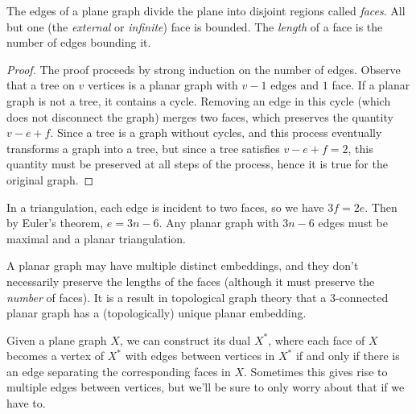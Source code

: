 The edges of a plane graph divide the plane into disjoint regions called \textit{faces}.  All but one (the \textit{external} or \textit{infinite}) face is bounded.  The \textit{length} of a face is the number of edges bounding it.


\begin{proof}
	
	The proof proceeds by strong induction on the number of edges. Observe that a tree on $v$ vertices is a planar graph with $v-1$ edges and $1$ face.  If a planar graph is not a tree, it contains a cycle.  Removing an edge in this cycle (which does not disconnect the graph) merges two faces, which preserves the quantity $v-e+f$.  Since a tree is a graph without cycles, and this process eventually transforms a graph into a tree, but since a tree satisfies $v-e+f=2$, this quantity must be preserved at all steps of the process, hence it is true for the original graph.
	
	
\end{proof}


In a triangulation, each edge is incident to two faces, so we have $3f=2e$.  Then by Euler's theorem, $e=3n-6$.  Any planar graph with $3n-6$ edges must be maximal and a planar triangulation.

A planar graph may have multiple distinct embeddings, and they don't necessarily preserve the lengths of the faces (although it must preserve the \textit{number} of faces).  It is a result in topological graph theory that a $3$-connected planar graph has a (topologically) unique planar embedding.

Given a plane graph $X$, we can construct its dual $X^*$, where each face of $X$ becomes a vertex of $X^*$ with edges between vertices in $X^*$ if and only if there is an edge separating the corresponding faces in $X$.  Sometimes this gives rise to multiple edges between vertices, but we'll be sure to only worry about that if we have to.

